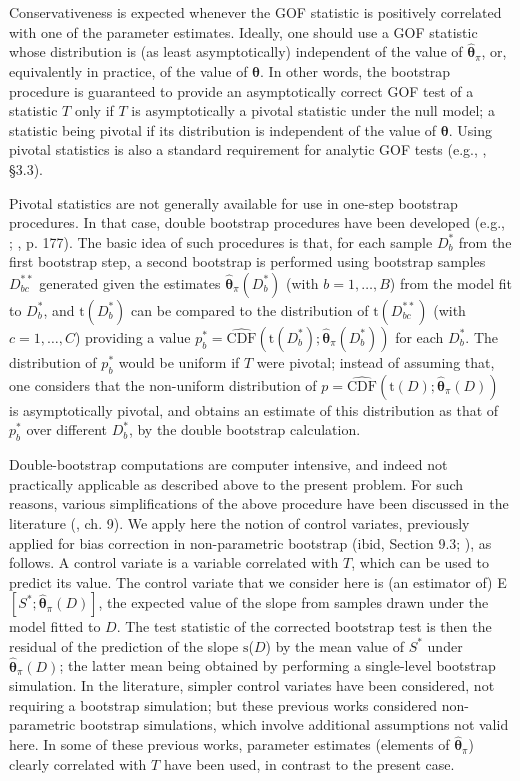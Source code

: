 \documentclass[a4paper]{article}\usepackage[]{graphicx}\usepackage[]{color}
\newcommand{\data}{\ensuremath{D}}
\newcommand{\datab}{\ensuremath{D_{b}^*}}
\newcommand{\databb}{\ensuremath{D_{bc}^{**}}}
\newcommand{\boo}[1]{\ensuremath{{#1}_{b}^{*}}}
\newcommand{\CDF}{\ensuremath{\mathrm{CDF}}}
\newcommand{\sfn}{\ensuremath{\mathrm{s}}}
\newcommand{\tfn}{\ensuremath{\mathrm{t}}}
\newcommand{\bth}{\ensuremath{\boldsymbol{\theta}}}
\begin{document}
Conservativeness is expected whenever the GOF statistic is positively correlated with one of the parameter estimates. Ideally, one should use a GOF statistic whose distribution is (as least asymptotically) independent of the value of $\hat{\bth}_\pi$, or, equivalently in practice, of the value of $\bth$. In other words, the bootstrap procedure is guaranteed to provide an asymptotically correct GOF test of a statistic $T$ only if $T$ is asymptotically a pivotal statistic under the null model; a statistic being pivotal if its distribution is independent of the value of $\bth$. Using pivotal statistics is also a standard requirement for analytic GOF tests (e.g., \citealp{CoxH74}, §3.3).

Pivotal statistics are not generally available for use in one-step bootstrap procedures. In that case, double bootstrap procedures have been developed (e.g., \citealp{Beran88}; \citealp{DavisonH97}, p. 177).  The basic idea of such procedures is that, for each sample $\datab$ from the first bootstrap step, a second bootstrap is performed using bootstrap samples $\databb$ generated given the estimates $\hat{\bth}_\pi(\datab)$ (with $b=1,\ldots,B$) from the model fit to $\datab$, and $\tfn(\datab)$ can be compared to the distribution of $\tfn(\databb)$ (with $c=1,\ldots,C$) providing a value $\boo{p} = \hat{\CDF}(\tfn(\datab);\hat{\bth}_\pi(\datab) )$ for each $\datab$. The distribution of $\boo{p}$ would be uniform if $T$ were pivotal; instead of assuming that, one considers that the non-uniform distribution of $p= \hat{\CDF}(\tfn(\data);\hat{\bth}_\pi(\data))$ is asymptotically pivotal, and obtains an estimate of this distribution as that of \boo{p} over different $\datab$, by the double bootstrap calculation.

Double-bootstrap computations are computer intensive, and indeed not practically applicable as described above to the present problem. For such reasons, various simplifications of the above procedure have been discussed in the literature (\citealp{DavisonH97}, ch. 9). We apply here the notion of control variates, previously applied for bias correction in non-parametric bootstrap (ibid, Section 9.3; \citealp{Efron90}), as follows. A control variate is a variable correlated with $T$, which can be used to predict its value. The control variate that we consider here is (an estimator of) E$[S^*;\hat{\bth}_\pi(\data)]$, the expected value of the slope from samples drawn under the model fitted to \data. The test statistic of the corrected bootstrap test is then the residual of the prediction of the slope \sfn(\data)  by the mean value of $S^*$ under $\hat{\bth}_\pi(\data)$; the latter mean being obtained by performing a single-level bootstrap simulation. In the literature, simpler control variates have been considered, not requiring a bootstrap simulation; but these previous works considered non-parametric bootstrap simulations, which involve additional assumptions not valid here. In some of these previous works, parameter estimates (elements of $\hat{\bth}_\pi$) clearly correlated with $T$ have been used, in contrast to the present case.
\end{document}
